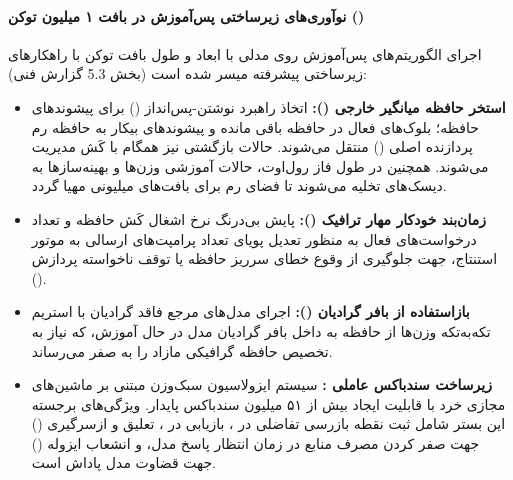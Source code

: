 \paragraph*{نوآوری‌های زیرساختی پس‌آموزش در بافت ۱ میلیون توکن ()}
اجرای الگوریتم‌های پس‌آموزش روی مدلی با ابعاد  و طول بافت  توکن با راهکارهای زیرساختی پیشرفته میسر شده است (بخش 5.3 گزارش فنی):
\begin{itemize}
    \item \textbf{استخر حافظه میانگیر خارجی ():} اتخاذ راهبرد نوشتن-پس‌انداز () برای پیشوندهای حافظه؛ بلوک‌های فعال در حافظه  باقی مانده و پیشوندهای بیکار به حافظه رم پردازنده اصلی () منتقل می‌شوند. حالات بازگشتی  نیز همگام با کَش  مدیریت می‌شوند. همچنین در طول فاز رول‌اوت، حالات آموزشی وزن‌ها و بهینه‌سازها به دیسک‌های  تخلیه می‌شوند تا فضای رم برای بافت‌های میلیونی مهیا گردد.
    \item \textbf{زمان‌بند خودکار مهار ترافیک ():} پایش بی‌درنگ نرخ اشغال کَش حافظه و تعداد درخواست‌های فعال به منظور تعدیل پویای تعداد پرامپت‌های ارسالی به موتور استنتاج، جهت جلوگیری از وقوع خطای سرریز حافظه یا توقف ناخواسته پردازش ().
    \item \textbf{بازاستفاده از بافر گرادیان ():} اجرای مدل‌های مرجع فاقد گرادیان با استریم تکه‌به‌تکه وزن‌ها از حافظه  به داخل بافر گرادیان  مدل در حال آموزش، که نیاز به تخصیص حافظه گرافیکی مازاد را به صفر می‌رساند.
    \item \textbf{زیرساخت سندباکس عاملی :} سیستم ایزولاسیون سبک‌وزن مبتنی بر ماشین‌های مجازی خرد  \cite{agache2020firecracker} با قابلیت ایجاد بیش از ۵۱ میلیون سندباکس پایدار. ویژگی‌های برجسته این بستر شامل ثبت نقطه بازرسی تفاضلی در ، بازیابی در ، تعلیق و ازسرگیری () جهت صفر کردن مصرف منابع در زمان انتظار پاسخ مدل، و انشعاب ایزوله () جهت قضاوت مدل پاداش است.
\end{itemize}